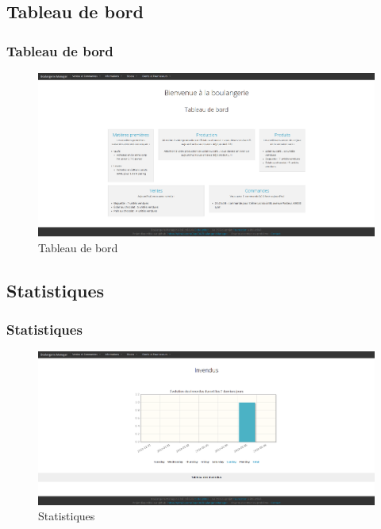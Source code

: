 \subsection{Tableau de bord}
\begin{frame}
\frametitle{Tableau de bord}
\begin{figure}[h!]
    \centerline{\includegraphics[width=1\textwidth]{images/tableau_de_bord.png}}
    \caption{Tableau de bord}
\end{figure}
\end{frame}

\subsection{Statistiques}
\begin{frame}
\frametitle{Statistiques}
\begin{figure}[h!]
    \centerline{\includegraphics[width=1\textwidth]{images/Invendus.png}}
    \caption{Statistiques}
\end{figure}
\end{frame}

